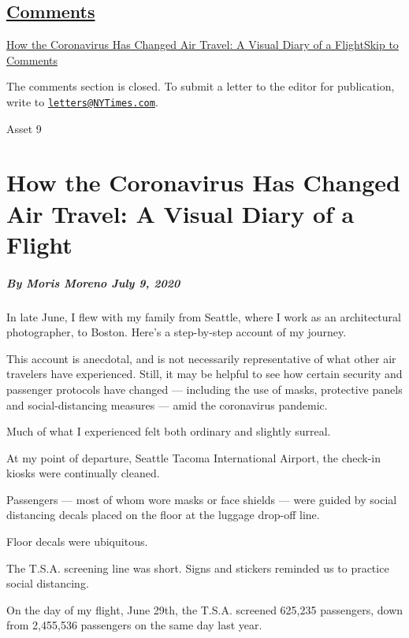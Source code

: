 \hypertarget{comments}{%
\subsection{\texorpdfstring{\protect\hyperlink{commentsContainer}{Comments}}{Comments}}\label{comments}}

\href{}{How the Coronavirus Has Changed Air Travel: A Visual Diary of a
Flight}\href{}{Skip to Comments}

The comments section is closed. To submit a letter to the editor for
publication, write to
\href{mailto:letters@NYTimes.com}{\nolinkurl{letters@NYTimes.com}}.

Asset 9

\hypertarget{how-the-coronavirus-has-changed-air-travel-a-visual-diary-of-a-flight}{%
\section{How the Coronavirus Has Changed Air Travel: A Visual Diary of a
Flight}\label{how-the-coronavirus-has-changed-air-travel-a-visual-diary-of-a-flight}}

\hypertarget{by-moris-moreno-july-9-2020}{%
\subparagraph{By Moris Moreno July 9,
2020}\label{by-moris-moreno-july-9-2020}}

In late June, I flew with my family from Seattle, where I work as an
architectural photographer, to Boston. Here's a step-by-step account of
my journey.

This account is anecdotal, and is not necessarily representative of what
other air travelers have experienced. Still, it may be helpful to see
how certain security and passenger protocols have changed --- including
the use of masks, protective panels and social-distancing measures ---
amid the coronavirus pandemic.

Much of what I experienced felt both ordinary and slightly surreal.

At my point of departure, Seattle Tacoma International Airport, the
check-in kiosks were continually cleaned.

Passengers --- most of whom wore masks or face shields --- were guided
by social distancing decals placed on the floor at the luggage drop-off
line.

Floor decals were ubiquitous.

The T.S.A. screening line was short. Signs and stickers reminded us to
practice social distancing.

On the day of my flight, June 29th, the T.S.A. screened 625,235
passengers, down from 2,455,536 passengers on the same day last year.

